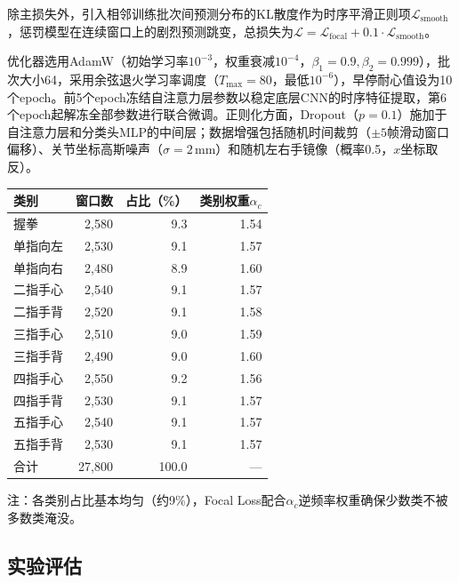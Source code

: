 除主损失外，引入相邻训练批次间预测分布的KL散度作为时序平滑正则项$\mathcal{L}_{\mathrm{smooth}}$，惩罚模型在连续窗口上的剧烈预测跳变，总损失为$\mathcal{L}=\mathcal{L}_{\mathrm{focal}}+0.1\cdot\mathcal{L}_{\mathrm{smooth}}$。

优化器选用AdamW（初始学习率$10^{-3}$，权重衰减$10^{-4}$，$\beta_1=0.9,\beta_2=0.999$），批次大小64，采用余弦退火学习率调度（$T_{\max}=80$，最低$10^{-6}$），早停耐心值设为10个epoch。前5个epoch冻结自注意力层参数以稳定底层CNN的时序特征提取，第6个epoch起解冻全部参数进行联合微调。正则化方面，Dropout（$p=0.1$）施加于自注意力层和分类头MLP的中间层；数据增强包括随机时间裁剪（$\pm5$帧滑动窗口偏移）、关节坐标高斯噪声（$\sigma=2$\,mm）和随机左右手镜像（概率0.5，$x$坐标取反）。

\begin{center}
    \small
    \begin{tabular}{lrrr}
    \hline
    类别 & 窗口数 & 占比（\%） & 类别权重$\alpha_c$ \\
    \hline
    握拳 & 2,580 & 9.3 & 1.54 \\
    单指向左 & 2,530 & 9.1 & 1.57 \\
    单指向右 & 2,480 & 8.9 & 1.60 \\
    二指手心 & 2,540 & 9.1 & 1.57 \\
    二指手背 & 2,520 & 9.1 & 1.58 \\
    三指手心 & 2,510 & 9.0 & 1.59 \\
    三指手背 & 2,490 & 9.0 & 1.60 \\
    四指手心 & 2,550 & 9.2 & 1.56 \\
    四指手背 & 2,530 & 9.1 & 1.57 \\
    五指手心 & 2,540 & 9.1 & 1.57 \\
    五指手背 & 2,530 & 9.1 & 1.57 \\
    \hline
    合计 & 27,800 & 100.0 & — \\
    \hline
    \end{tabular}
    \noindent\begin{minipage}{\linewidth}\footnotesize
    注：各类别占比基本均匀（约9\%），Focal Loss配合$\alpha_c$逆频率权重确保少数类不被多数类淹没。
    \end{minipage}
\end{center}

\subsection{实验评估}

